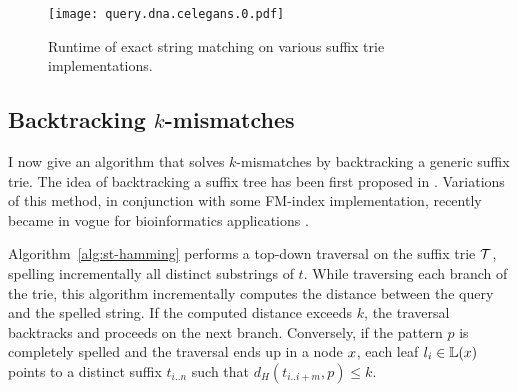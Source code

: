 \begin{figure}[h]
\begin{center}
\caption[Exact string matching runtime]{Runtime of exact string matching on various suffix trie implementations.}
\label{fig:query-dna-exact}
\texttt{[image: query.dna.celegans.0.pdf]}
\end{center}
\end{figure}

\subsection{Backtracking $k$-mismatches}
\label{sec:index:algo:kmismatches}

I now give an algorithm that solves $k$-mismatches by backtracking a generic suffix trie.
The idea of backtracking a suffix tree has been first proposed in \citep{Ukkonen1993}.
Variations of this method, in conjunction with some FM-index implementation, recently became in vogue for bioinformatics applications \citep{Langmead2009, Li2009}.

Algorithm~\ref{alg:st-hamming} performs a top-down traversal on the suffix trie $\mathcal {T}$, spelling incrementally all distinct substrings of $t$.
While traversing each branch of the trie, this algorithm incrementally computes the distance between the query and the spelled string.
If the computed distance exceeds $k$, the traversal backtracks and proceeds on the next branch.
Conversely, if the pattern $p$ is completely spelled and the traversal ends up in a node $x$, each leaf $l_i \in \mathbb {L}(x)$ points to a distinct suffix $t_{i..n}$ such that $d_H(t_{i..i+m}, p) \leq k$.


